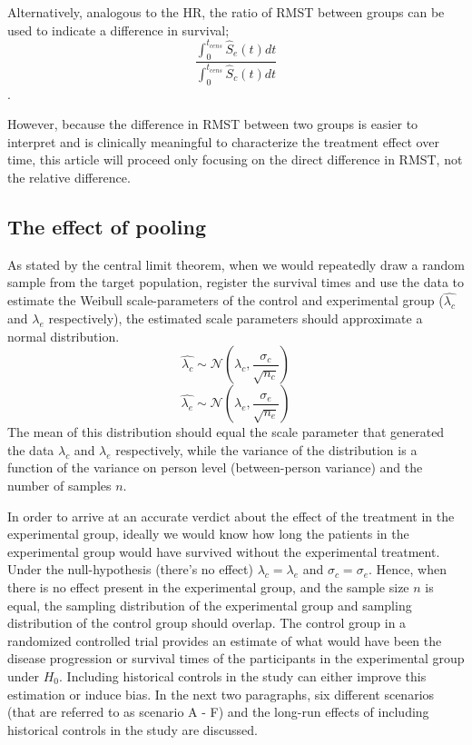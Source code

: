 \documentclass[Royal,sagev,times]{sagej}
\begin{document}
Alternatively, analogous to the HR, the ratio of RMST between groups can be used to indicate a difference in survival;
\begin{equation}
\frac{\int_0^{t_{cens}} \! \hat{S}_e(t) dt}{\int_0^{t_{cens}} \! \hat{S}_c(t) dt}
\end{equation}.\cite{huang2018RMST}

However, because the difference in RMST between two groups is easier to interpret and is clinically meaningful to characterize the treatment effect over time,\cite{huang2018RMST} this article will proceed only focusing on the direct difference in RMST, not the relative difference.\\

\subsection{The effect of pooling}
As stated by the central limit theorem, when we would repeatedly draw a random sample from the target population, register the survival times and use the data to estimate the Weibull scale-parameters of the control and experimental group
($\hat{\lambda_c}$ and $\hat{\lambda_e}$ respectively), the estimated scale parameters should approximate a normal distribution.\cite{koti2013} 
\begin{equation}
\hat{\lambda_c} \sim \mathcal{N}(\lambda_{c}, \frac{\sigma_{c}}{\sqrt{n_c}}) \end{equation}
\begin{equation}
\hat{\lambda_e} \sim \mathcal{N}(\lambda_{e}, \frac{\sigma_{e}}{\sqrt{n_e}}) 
\end{equation}
The mean of this distribution should equal the scale parameter that generated the data $\lambda_c$ and $\lambda_e$ respectively, while the variance of the distribution is a function of the variance on person level (between-person variance) and the number of samples $n$. 

In order to arrive at an accurate verdict about the effect of the treatment in the experimental group, ideally we would know how long the patients in the experimental group would have survived without the experimental treatment. Under the null-hypothesis (there's no effect) $\lambda_{c}=\lambda_{e}$ and $\sigma_{c}=\sigma_{e}$. Hence, when there is no effect present in the experimental group, and the sample size $n$ is equal, the sampling distribution of the experimental group and sampling distribution of the control group should overlap. The control group in a randomized controlled trial provides an estimate of what would have been the disease progression or survival times of the participants in the experimental group under $H_0$. Including historical controls in the study can either improve this estimation or induce bias. In the next two paragraphs, six different scenarios (that are referred to as scenario A - F) and the long-run effects of including historical controls in the study are discussed.
\end{document}
